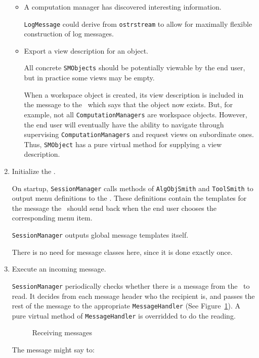 \begin{enumerate}
\begin{itemize}
\item
A computation manager has discovered interesting information.

{\tt LogMessage} could derive from {\tt ostrstream} to allow for
maximally flexible construction of log messages.

\item
Export a view description for an object.

All concrete {\tt SMObjects} should be potentially viewable by the end
user, but in practice some views may be empty.

When a workspace object is created, its view description is included
in the message to the \FE\ which says that the object now exists. But,
for example, not all {\tt ComputationManagers} are workspace objects.
However, the end user will eventually have the ability to navigate
through supervising {\tt ComputationManagers} and request views on
subordinate ones. Thus, {\tt SMObject} has a pure virtual method for
supplying a view description.

\end{itemize}

\item
Initialize the \FE.

On startup, {\tt SessionManager} calls methods of {\tt AlgObjSmith}
and {\tt ToolSmith} to output menu definitions to the \FE. These
definitions contain the templates for the message the \FE\ should send
back when the end user chooses the corresponding menu item.

{\tt SessionManager} outputs global message templates itself.

There is no need for message classes here, since it is done exactly
once.

\item
Execute an incoming message.

{\tt SessionManager} periodically checks whether there is a message
from the \FE\ to read. It decides from each message header who the
recipient is, and passes the rest of the message to the appropriate
{\tt MessageHandler} (See Figure~\ref{sm2}). A pure virtual method of
{\tt MessageHandler} is overridded to do the reading.

\begin{figure}[htbp]
\caption{Receiving messages}\label{sm2}
\end{figure}

The message might say to:

\begin{itemize}


\end{itemize}
\end{enumerate}
